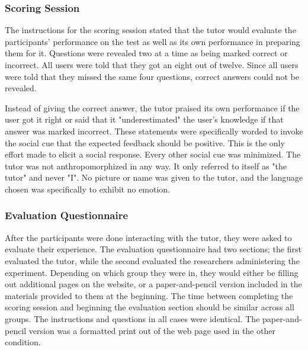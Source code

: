 \documentclass{sig-alternate-05-2015}
\begin{document}
{\subsubsection{Scoring Session}
The instructions for the scoring session stated that the tutor would evaluate the participants' performance on the test as well as its own performance in preparing them for it.  Questions were revealed two at a time as being marked correct or incorrect.  All users were told that they got an eight out of twelve.  Since all users were told that they  missed the same four questions, correct answers could not be revealed.  

Instead of giving the correct answer, the tutor praised its own performance if the user got it right or said that it "underestimated" the user's knowledge if that answer was marked incorrect.  These statements were specifically worded to invoke the social cue that the expected feedback should be positive. This is the only effort made to elicit a social response. Every other social cue was minimized.  The tutor was not anthropomorphized in any way.  It only referred to itself as "the tutor" and never "I".  No picture or name was given to the tutor, and the language chosen was specifically to exhibit no emotion.  


\subsubsection{Evaluation Questionnaire}
After the participants were done interacting with the tutor, they were asked to evaluate their experience.  The evaluation questionnaire had two sections; the first evaluated the tutor, while the second evaluated the researchers administering the experiment.  Depending on which group they were in, they would either be filling out additional pages on the website, or a paper-and-pencil version included in the materials provided to them at the beginning.  The time between completing the scoring session and beginning the evaluation section should be similar across all groups.  The instructions and questions in all cases were identical.  The paper-and-pencil version was a formatted print out of the web page used in the other condition.

}
\end{document}
